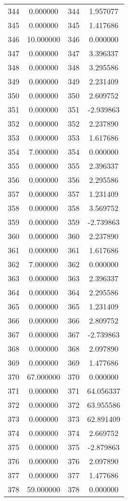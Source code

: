 \documentclass[12pt]{article}
\begin{document}
\begin{longtable}{@{}cccc@{}}
344 & 0.000000 & 344 & 1.957077 \\
345 & 0.000000 & 345 & 1.417686 \\
346 & 10.000000 & 346 & 0.000000 \\
347 & 0.000000 & 347 & 3.396337 \\
348 & 0.000000 & 348 & 3.295586 \\
349 & 0.000000 & 349 & 2.231409 \\
350 & 0.000000 & 350 & 2.609752 \\
351 & 0.000000 & 351 & -2.939863 \\
352 & 0.000000 & 352 & 2.237890 \\
353 & 0.000000 & 353 & 1.617686 \\
354 & 7.000000 & 354 & 0.000000 \\
355 & 0.000000 & 355 & 2.396337 \\
356 & 0.000000 & 356 & 2.295586 \\
357 & 0.000000 & 357 & 1.231409 \\
358 & 0.000000 & 358 & 3.569752 \\
359 & 0.000000 & 359 & -2.739863 \\
360 & 0.000000 & 360 & 2.237890 \\
361 & 0.000000 & 361 & 1.617686 \\
362 & 7.000000 & 362 & 0.000000 \\
363 & 0.000000 & 363 & 2.396337 \\
364 & 0.000000 & 364 & 2.295586 \\
365 & 0.000000 & 365 & 1.231409 \\
366 & 0.000000 & 366 & 2.809752 \\
367 & 0.000000 & 367 & -2.739863 \\
368 & 0.000000 & 368 & 2.097890 \\
369 & 0.000000 & 369 & 1.477686 \\
370 & 67.000000 & 370 & 0.000000 \\
371 & 0.000000 & 371 & 64.056337 \\
372 & 0.000000 & 372 & 63.955586 \\
373 & 0.000000 & 373 & 62.891409 \\
374 & 0.000000 & 374 & 2.669752 \\
375 & 0.000000 & 375 & -2.879863 \\
376 & 0.000000 & 376 & 2.097890 \\
377 & 0.000000 & 377 & 1.477686 \\
378 & 59.000000 & 378 & 0.000000 \\

\end{longtable}
\end{document}
